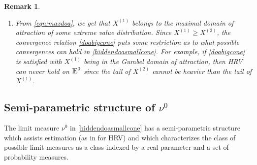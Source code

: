 \documentclass[11 pt]{amsart}
\newtheorem{rem}[thm]{Remark}
\numberwithin{equation}{section}
\begin{document}
\begin{rem}
{{\begin{enumerate}
\item From \eqref{eqn:maxdoa}, we get that $X^{(1)}$ belongs to the
  maximal domain of attraction of some extreme value
  distribution. Since $X^{(1)} \ge X^{(2)}$, the convergence relation
  \eqref{doabigcone} puts some restriction as to what possible
  convergences can hold in \eqref{hiddendoasmallcone}. For example, if
  \eqref{doabigcone} is satisfied with $X^{(1)}$ being in the Gumbel
  domain of attraction, then HRV can never hold on ${\mathop{\rm I\kern -0.20em E}\nolimits}^0$ since the
  tail of $X^{(2)}$ cannot be heavier than the tail of $X^{(1)}$. 
\end{enumerate}
}}
\end{rem}

\subsection{Semi-parametric structure of
  $\nu^0$} \label{sec:semiparaoflimit} 
The limit measure $\nu^0$ in
\eqref{hiddendoasmallcone} has a semi-parametric structure which
assists estimation (as in \citep{mitra:resnick:2010a} for HRV) and
which characterizes the class of possible limit measures as a class
indexed by a real parameter and a set of probability measures.
\end{document}
